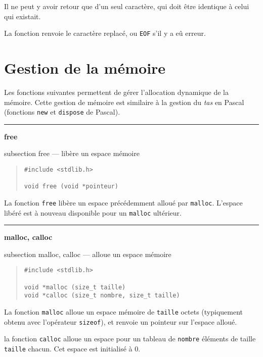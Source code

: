 \documentclass [twoside] {report}
\newcommand {\primitive} [1]
    {
	{\large \bf #1}
	\addcontentsline {toc} {subsection} {#1}
    }
\newcommand {\separation}
    {
	\vspace {7mm}
	\nopagebreak
	\hrule
    }
\begin{document}
Il ne peut y avoir retour que d'un seul caractère, qui doit
être identique à celui qui existait.

La fonction renvoie le caractère replacé, ou {\tt EOF} s'il y
a eû erreur.




\section {Gestion de la mémoire}


Les fonctions suivantes permettent de gérer l'allocation
dynamique de la mémoire. Cette gestion de mémoire est
similaire à la gestion du {\em tas} en Pascal (fonctions {\tt new}
et {\tt dispose} de Pascal).




\separation
\primitive {free} --- libère un espace mémoire

\begin {quote}
\begin {verbatim}
#include <stdlib.h>

void free (void *pointeur)
\end{verbatim}
\end {quote}

La fonction {\tt free} libère un espace précédemment alloué
par {\tt malloc}. L'espace libéré est à nouveau disponible pour
un {\tt malloc} ultérieur.



\separation
\primitive {malloc, calloc} --- alloue un espace mémoire

\begin {quote}
\begin {verbatim}
#include <stdlib.h>

void *malloc (size_t taille)
void *calloc (size_t nombre, size_t taille)
\end{verbatim}
\end {quote}

La fonction {\tt malloc} alloue un espace mémoire de
{\tt taille} octets (typiquement obtenu avec l'opérateur
{\tt sizeof}), et renvoie un pointeur sur l'espace alloué.

la fonction {\tt calloc} alloue un espace pour un tableau de
{\tt nombre} éléments de taille {\tt taille} chacun. Cet espace
est initialisé à 0.
\end{document}
